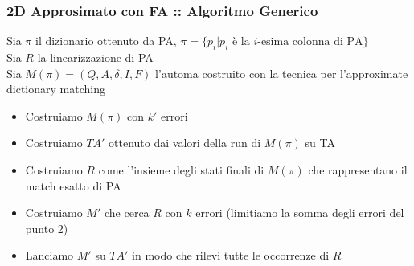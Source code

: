 \documentclass{beamer}
\begin{document}
\begin{frame}
\frametitle{2D Approsimato con FA :: Algoritmo Generico}
\begin{definition}
	Sia $\pi$ il dizionario ottenuto da PA, $\pi= \{p_i | p_i \text{ è la } i \text{-esima colonna di PA}\}$\\
	Sia $R$ la linearizzazione di PA\\
	Sia $M(\pi) = (Q,A,\delta,I,F)$ l'automa costruito con la tecnica per l'approximate dictionary matching\\
\end{definition}
\begin{itemize}
\item Costruiamo $M(\pi)$ con $k'$ errori 
\item Costruiamo $TA'$ ottenuto dai valori della run di $M(\pi)$ su TA
\item Costruiamo $R$ come l'insieme degli stati finali di $M(\pi)$ che rappresentano il match esatto di PA
\item Costruiamo $M'$ che cerca $R$ con $k$ errori (limitiamo la somma degli errori del punto 2)
\item Lanciamo $M'$ su $TA'$ in modo che rilevi tutte le occorrenze di $R$
\end{itemize}

\end{frame}
\end{document}
